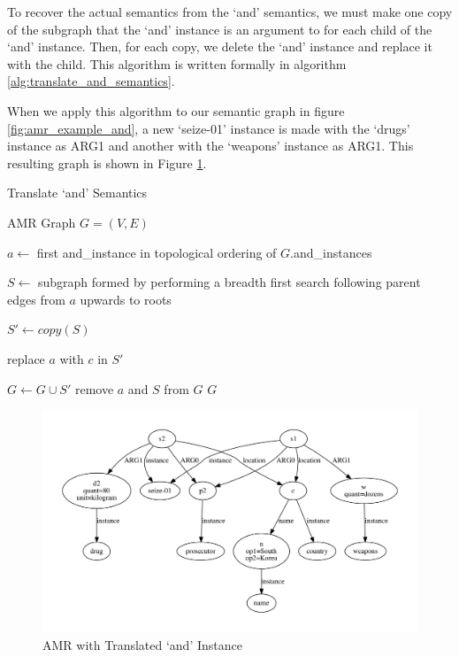 \documentclass[12pt]{article}
\begin{document}
To recover the actual semantics from the `and' semantics, we must make one copy of the subgraph that the `and' instance is an argument to for each child of the `and' instance. Then, for each copy, we delete the `and' instance and replace it with the child. This algorithm is written formally in algorithm \ref{alg:translate_and_semantics}.

When we apply this algorithm to our semantic graph in figure \ref{fig:amr_example_and}, a new `seize-01' instance is made with the `drugs' instance as ARG1 and another with the `weapons' instance as ARG1. This resulting graph is shown in Figure \ref{fig:amr_example_and_removed}.

\begin{algorithm}
\caption{Translate `and' Semantics}
\label{alg:translate_and_semantics}
\begin{algorithmic}[1]
\REQUIRE AMR Graph $G = (V, E)$

    \STATE $a \gets$ first and\_instance in topological ordering of $G$.and\_instances

    \STATE $S \gets$ subgraph formed by performing a breadth first search following parent edges from $a$ upwards to roots

        \STATE $S' \gets copy(S)$

        \STATE replace $a$ with $c$ in $S'$

        \STATE $G \gets G \cup S'$
    \ENDFOR
    \STATE remove $a$ and $S$ from $G$
\ENDWHILE
\RETURN $G$
\end{algorithmic}
\end{algorithm}

\begin{figure}
\includegraphics[width=\linewidth]{amr_example_and_removed.pdf}
\caption{AMR with Translated `and' Instance}
\label{fig:amr_example_and_removed}
\end{figure}
\end{document}
